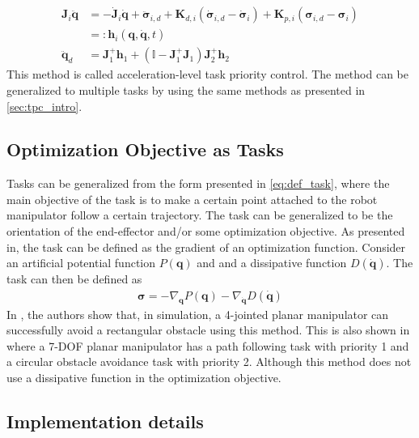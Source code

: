 \begin{subequations}
\begin{align}
    \bm{J}_i\ddot{\bm{q}} &= -\dot{\bm{J}}_i\dot{\bm{q}} + \ddot{\bm{\sigma}}_{i,d} 
    + \bm{K}_{d,i}\left(\dot{\bm{\sigma}}_{i,d} - \dot{\bm{\sigma}}_i\right)
    + \bm{K}_{p,i}\left(\bm{\sigma}_{i,d} - \bm{\sigma}_i\right) \\
    &=: \bm{h}_i(\bm{q}, \dot{\bm{q}}, t) \\
    \ddot{\bm{q}}_d &= \bm{J}_1^{+} \bm{h}_1 + \left(\mathbb{I} - \bm{J}_1^+\bm{J}_1\right) \bm{J}_2^{+} \bm{h}_2
\end{align}
\end{subequations}
This method is called acceleration-level task priority control. The method can
be generalized to multiple tasks by using the same methods as presented in \autoref{sec:tpc_intro}.

\subsection{Optimization Objective as Tasks}

Tasks can be generalized from the form presented in \autoref{eq:def_task}, where
the main objective of the task is to make a certain point attached to the robot
manipulator follow a certain trajectory. The task can be generalized to be the
orientation of the end-effector and/or some optimization objective. As presented
in\cite{nakamura1987}, the task can be defined as the gradient of an optimization
function. Consider an artificial potential function $P(\bm{q})$ and and a dissipative function
$D(\dot{\bm{q}})$. The task can then be defined as
\begin{align}
    \bm{\sigma} = -\nabla_{\bm{q}} P(\bm{q}) - \nabla_{\dot{\bm{q}}}D(\dot{\bm{q}})
\end{align}
In \cite{nakamura1987}, the authors show that, in simulation, a 4-jointed planar
manipulator can successfully avoid a rectangular obstacle using this method. This is
also shown in \cite{siciliano1991} where a 7-DOF planar manipulator has a path
following task with priority 1 and a circular obstacle avoidance task with priority 2.
Although this method does not use a dissipative function in the optimization objective.

\subsection{Implementation details}

